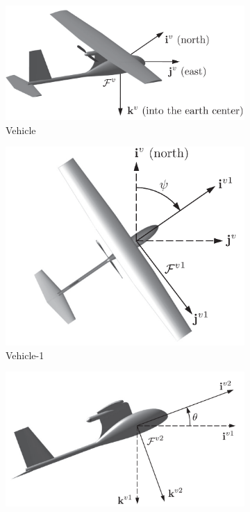 \begin{figure}[!ht]
    \centering
    \begin{subfigure}{0.38\textwidth}
        \centering
         \includegraphics[width=\textwidth]{figures/vehicle.png}
         \caption{Vehicle}\label{fig:vehicle}
    \end{subfigure}
    \begin{subfigure}{0.38\textwidth}
        \centering
         \includegraphics[width=\textwidth]{figures/vehicle-1.png}
         \caption{Vehicle-1}\label{fig:vehicle-1}
    \end{subfigure}
    \begin{subfigure}{0.38\textwidth}
        \centering
         \includegraphics[width=\textwidth]{figures/vehicle-2.png}

\end{subfigure}
\end{figure}
